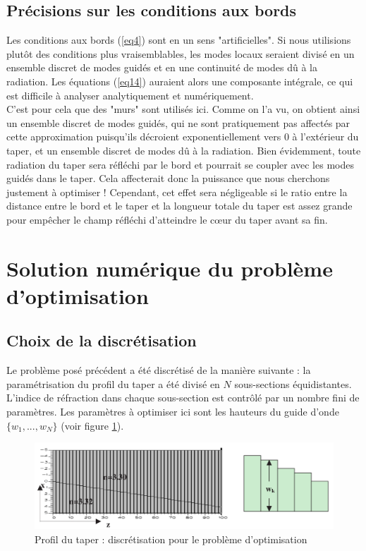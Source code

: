 \documentclass{article}
\begin{document}
\subsection{Précisions sur les conditions aux bords}
Les conditions aux bords (\ref{eq4}) sont en un sens "artificielles". Si nous utilisions plutôt des conditions plus vraisemblables, les modes locaux seraient divisé en un ensemble discret de modes guidés et en une continuité de modes dû à la radiation. Les équations (\ref{eq14}) auraient alors une composante intégrale, ce qui est difficile à analyser analytiquement et numériquement.\\
C'est pour cela que des "murs" sont utilisés ici. Comme on l'a vu, on obtient ainsi un ensemble discret de modes guidés, qui ne sont pratiquement pas affectés par cette approximation puisqu'ils décroient exponentiellement vers 0 à l'extérieur du taper, et un ensemble discret de modes dû à la radiation. Bien évidemment, toute radiation du taper sera réfléchi par le bord et pourrait se coupler avec les modes guidés dans le taper. Cela affecterait donc la puissance que nous cherchons justement à optimiser ! Cependant, cet effet sera négligeable si le ratio entre la distance entre le bord et le taper et la longueur totale du taper est assez grande pour empêcher le champ réfléchi d'atteindre le c\oe ur du taper avant sa fin.

\section{Solution numérique du problème d'optimisation}
\subsection{Choix de la discrétisation}
Le problème posé précédent a été discrétisé de la manière suivante : la paramétrisation du profil du taper a été divisé en $N$ sous-sections équidistantes. L'indice de réfraction dans chaque sous-section est contrôlé par un nombre fini de paramètres. Les paramètres à optimiser ici sont les hauteurs du guide d'onde $\{w_1,...,w_N\}$ (voir figure \ref{fig:numOpti}).
\begin{figure}[!h]
	\centering
	\includegraphics[scale=0.25]{images/numOpti.png}
	\caption{Profil du taper : discrétisation pour le problème d'optimisation}
	\label{fig:numOpti}
\end{figure}
\end{document}
